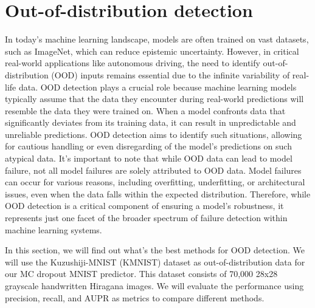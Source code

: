 \section{Out-of-distribution detection}
In today's machine learning landscape, models are often trained on vast datasets, such as ImageNet, which can reduce epistemic uncertainty. However, in critical real-world applications like autonomous driving, the need to identify out-of-distribution (OOD) inputs remains essential due to the infinite variability of real-life data. OOD detection plays a crucial role because machine learning models typically assume that the data they encounter during real-world predictions will resemble the data they were trained on. When a model confronts data that significantly deviates from its training data, it can result in unpredictable and unreliable predictions. OOD detection aims to identify such situations, allowing for cautious handling or even disregarding of the model's predictions on such atypical data. It's important to note that while OOD data can lead to model failure, not all model failures are solely attributed to OOD data. Model failures can occur for various reasons, including overfitting, underfitting, or architectural issues, even when the data falls within the expected distribution. Therefore, while OOD detection is a critical component of ensuring a model's robustness, it represents just one facet of the broader spectrum of failure detection within machine learning systems.

In this section, we will find out what's the best methods for OOD detection. We will use the Kuzushiji-MNIST (KMNIST) dataset as out-of-distribution data for our MC dropout MNIST predictor. This dataset consists of 70,000 28x28 grayscale handwritten Hiragana images. We will evaluate the performance using precision, recall, and AUPR as metrics to compare different methods.

